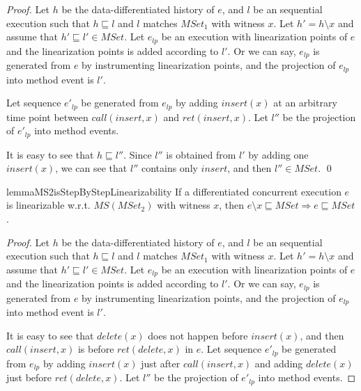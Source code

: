 {\begin {proof}
Let $h$ be the data-differentiated history of $e$, and $l$ be an sequential execution such that $h \sqsubseteq l$ and $l$ matches $\textit{MSet}_1$ with witness $x$. Let $h'=h \setminus x$ and assume that $h' \sqsubseteq l' \in \textit{MSet}$. Let $e_{\textit{lp}}$ be an execution with linearization points of $e$ and the linearization points is added according to $l'$. Or we can say, $e_{\textit{lp}}$ is generated from $e$ by instrumenting linearization points, and the projection of $e_{\textit{lp}}$ into method event is $l'$.

Let sequence $e'_{\textit{lp}}$ be generated from $e_{\textit{lp}}$ by adding $\textit{insert}(x)$ at an arbitrary time point between $\textit{call}(\textit{insert},x)$ and $\textit{ret}(\textit{insert},x)$. Let $l''$ be the projection of $e'_{\textit{lp}}$ into method events.

It is easy to see that $h \sqsubseteq l''$. Since $l''$ is obtained from $l'$ by adding one $\textit{insert}(x)$, we can see that $l''$ contains only $\textit{insert}$, and then $l'' \in \textit{MSet}$. \qed
\end {proof}


\begin{restatable}{lemma}{MS2isStepByStepLinearizability}
\label{lemma:MS2 is step-by-step linearizability}
If a differentiated concurrent execution $e$ is linearizable w.r.t. $\textit{MS}(\textit{MSet}_2)$ with witness $x$, then $e \setminus x \sqsubseteq \textit{MSet} \Rightarrow e \sqsubseteq \textit{MSet}$.
\end{restatable}

\begin {proof}
Let $h$ be the data-differentiated history of $e$, and $l$ be an sequential execution such that $h \sqsubseteq l$ and $l$ matches $\textit{MSet}_1$ with witness $x$. Let $h'=h \setminus x$ and assume that $h' \sqsubseteq l' \in \textit{MSet}$. Let $e_{\textit{lp}}$ be an execution with linearization points of $e$ and the linearization points is added according to $l'$. Or we can say, $e_{\textit{lp}}$ is generated from $e$ by instrumenting linearization points, and the projection of $e_{\textit{lp}}$ into method event is $l'$.

It is easy to see that $\textit{delete}(x)$ does not happen before $\textit{insert}(x)$, and then $\textit{call}(\textit{insert},x)$ is before $\textit{ret}(\textit{delete},x)$ in $e$. Let sequence $e'_{\textit{lp}}$ be generated from $e_{\textit{lp}}$ by adding $\textit{insert}(x)$ just after $\textit{call}(\textit{insert},x)$ and adding $\textit{delete}(x)$ just before $\textit{ret}(\textit{delete},x)$. Let $l''$ be the projection of $e'_{\textit{lp}}$ into method events.


\end{proof}}
